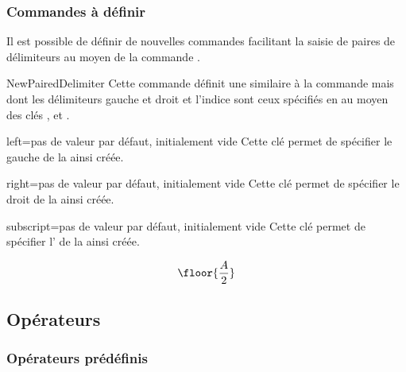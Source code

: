 \documentclass[english,nolocaltoc]{nwejmart}
\newtheorem[style=definition]{fait}
\newtheorem[title=expérience]{experience}
\newtheorem[title-plural=anneaux]{anneau}
\newtheorem[title=idéal,title-plural=idéaux]{ideal}
\begin{document}
\subsubsection{Commandes à définir}

Il est possible de définir de nouvelles commandes facilitant la saisie de paires
de délimiteurs au moyen de la commande .
%
\begin{docCommand}{NewPairedDelimiter}{}
  Cette commande définit une  similaire à la commande
   mais dont les délimiteurs gauche et droit et l'indice
  sont ceux spécifiés en  au moyen des clés ,
   et .
  \begin{docKey}{left}{=}{pas de valeur par défaut,
      initialement vide}
    Cette clé permet de spécifier le  gauche de la  ainsi
    créée.
  \end{docKey}
  \begin{docKey}{right}{=}{pas de valeur par défaut,
      initialement vide}
    Cette clé permet de spécifier le  droit de la
     ainsi créée.
  \end{docKey}
  \begin{docKey}{subscript}{=}{pas de valeur par défaut,
      initialement vide}
    Cette clé permet de spécifier l' de la  ainsi
    créée.
  \end{docKey}
\end{docCommand}

\begin{preamblecode}[listing options={morekeywords={[2]left,right,subscript}}]
\end{preamblecode}
\begin{bodycode}
\begin{equation}
\floor{\frac{A}{2}}
\end{equation}
\end{bodycode}

\subsection{Opérateurs}

\subsubsection{Opérateurs prédéfinis}
\end{document}
